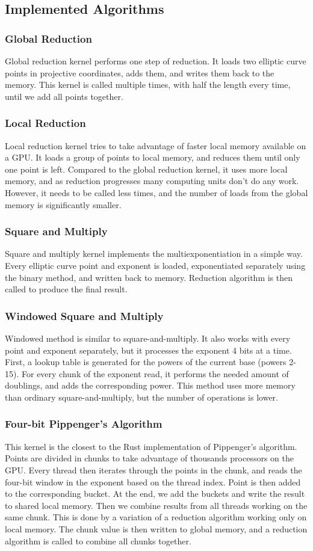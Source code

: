 \subsection{Implemented Algorithms}
\subsubsection{Global Reduction}
Global reduction kernel performs one step of reduction. It loads two elliptic curve points in projective coordinates, adds them, and writes them back to the memory. This kernel is called multiple times, with half the length every time, until we add all points together.
\subsubsection{Local Reduction}
Local reduction kernel tries to take advantage of faster local memory available on a GPU. It loads a group of points to local memory, and reduces them until only one point is left. Compared to the global reduction kernel, it uses more local memory, and as reduction progresses many computing units don't do any work. However, it needs to be called less times, and the number of loads from the global memory is significantly smaller.
\subsubsection{Square and Multiply}
Square and multiply kernel implements the multiexponentiation in a simple way. Every elliptic curve point and exponent is loaded, exponentiated separately using the binary method, and written back to memory. Reduction algorithm is then called to produce the final result.
\subsubsection{Windowed Square and Multiply}
Windowed method is similar to square-and-multiply. It also works with every point and exponent separately, but it processes the exponent 4 bits at a time. First, a lookup table is generated for the powers of the current base (powers 2-15). For every chunk of the exponent read, it performs the needed amount of doublings, and adds the corresponding power. This method uses more memory than ordinary square-and-multiply, but the number of operations is lower.
\subsubsection{Four-bit Pippenger's Algorithm}
This kernel is the closest to the Rust implementation of Pippenger's algorithm. Points are divided in chunks to take advantage of thousands processors on the GPU. Every thread then iterates through the points in the chunk, and reads the four-bit window in the exponent based on the thread index. Point is then added to the corresponding bucket. At the end, we add the buckets and write the result to shared local memory. Then we combine results from all threads working on the same chunk. This is done by a variation of a reduction algorithm working only on local memory. The chunk value is then written to global memory, and a reduction algorithm is called to combine all chunks together.
